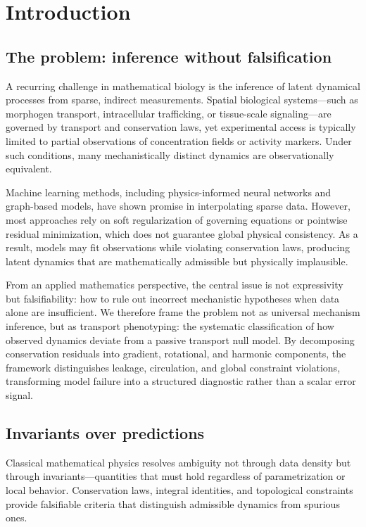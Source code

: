 \documentclass[10pt,article]{article}
\begin{document}
\section{Introduction}

\subsection{The problem: inference without falsification}
A recurring challenge in mathematical biology is the inference of latent dynamical processes from sparse, indirect measurements. Spatial biological systems—such as morphogen transport, intracellular trafficking, or tissue-scale signaling—are governed by transport and conservation laws, yet experimental access is typically limited to partial observations of concentration fields or activity markers. Under such conditions, many mechanistically distinct dynamics are observationally equivalent.

Machine learning methods, including physics-informed neural networks and graph-based models, have shown promise in interpolating sparse data\cite{raissi2019physics,shukla2022scalable}. However, most approaches rely on soft regularization of governing equations or pointwise residual minimization, which does not guarantee global physical consistency. As a result, models may fit observations while violating conservation laws, producing latent dynamics that are mathematically admissible but physically implausible.

From an applied mathematics perspective, the central issue is not expressivity but falsifiability: how to rule out incorrect mechanistic hypotheses when data alone are insufficient. We therefore frame the problem not as universal mechanism inference, but as transport phenotyping: the systematic classification of how observed dynamics deviate from a passive transport null model. By decomposing conservation residuals into gradient, rotational, and harmonic components, the framework distinguishes leakage, circulation, and global constraint violations, transforming model failure into a structured diagnostic rather than a scalar error signal.

\subsection{Invariants over predictions}

Classical mathematical physics resolves ambiguity not through data density but through invariants—quantities that must hold regardless of parametrization or local behavior. Conservation laws, integral identities, and topological constraints provide falsifiable criteria that distinguish admissible dynamics from spurious ones.
\end{document}
